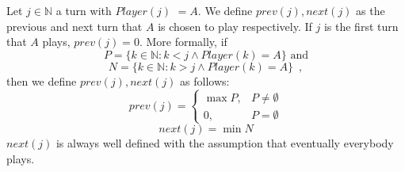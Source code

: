 \documentclass[11pt]{llncs}
\theoremstyle{definition}
\begin{document}
     \begin{definition}
        Let $j \in \mathbb{N}$ a turn with $Player\left(j\right)$ $= A$. We define $prev\left(j\right), next\left(j\right)$
        as the previous and next turn that $A$ is chosen to play respectively. If $j$ is the first turn that $A$ plays,
        $prev\left(j\right) = 0$. More formally, if
        \begin{equation*}
           P = \{k \in \mathbb{N} : k < j \wedge Player\left(k\right) = A\} \mbox{ and}
        \end{equation*}
        \begin{equation*}
           N = \{k \in \mathbb{N} : k > j \wedge Player\left(k\right) = A\} \enspace,
        \end{equation*}
        then we define $prev\left(j\right), next\left(j\right)$ as follows:
        \begin{equation}
           prev\left(j\right) = \begin{cases}
              \max{P}, & P \neq \emptyset \\
              0, & P = \emptyset
           \end{cases}
        \end{equation}
        \begin{equation}
           next\left(j\right) = \min{N}
        \end{equation}
        $next\left(j\right)$ is always well defined with the assumption that eventually everybody plays.
     \end{definition}
\end{document}
